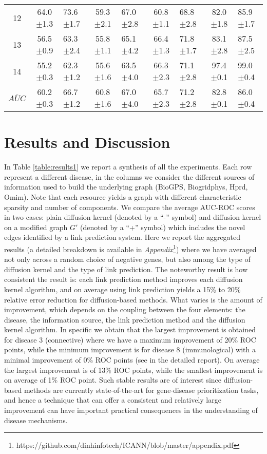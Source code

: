 {\begin{table*}[!htbp]
\begin{tabular}{|c|c|g|c|g|c|g|c|g|}
12 & 64.0$\pm$1.3 & 73.6$\pm$1.7 & 59.3$\pm$2.1 & 67.0$\pm$2.8 & 60.8$\pm$1.1 & 68.8$\pm$2.8 & 82.0$\pm$1.8 & 85.9$\pm$1.7 \\
13 & 56.5$\pm$0.9 & 63.3$\pm$2.4 & 55.8$\pm$1.1 & 65.1$\pm$4.2 & 66.4$\pm$1.3 & 71.8$\pm$1.7 & 83.1$\pm$2.8 & 87.5$\pm$2.5 \\
14 & 55.2$\pm$0.3 & 62.3$\pm$1.2 & 55.6$\pm$1.6 & 63.5$\pm$4.0 & 66.3$\pm$2.3 & 71.1$\pm$2.8 & 97.4$\pm$0.1 & 99.0$\pm$0.4 \\
\hline
$\overline{AUC}$ & 60.2$\pm$0.3 & 66.7$\pm$1.2 & 60.8$\pm$1.6 & 67.0$\pm$4.0 & 65.7$\pm$2.3 & 71.2$\pm$2.8 & 82.8$\pm$0.1 & 86.0$\pm$0.4 \\
\hline
\end{tabular}
\end{table*}

\section{Results and Discussion}
\label{results-discussion}
In Table \ref{table:results1} we report a synthesis of all the experiments. Each row represent a different disease, in the columns we consider the different sources of information used to build the underlying graph (BioGPS, Biogridphys, Hprd, Omim). Note that each resource yields a graph with different characteristic sparsity and number of components. We compare the average AUC-ROC scores in two cases: plain diffusion kernel (denoted by a ``-'' symbol) and diffusion kernel on a modified graph $G'$ (denoted by a ``+'' symbol) which includes the novel edges identified by a link prediction system. Here we report the aggregated results (a detailed breakdown is available in \textit{Appendix}\footnote{https://github.com/dinhinfotech/ICANN/blob/master/appendix.pdf}) where we have averaged not only across a random choice of negative genes, but also among the type of diffusion kernel and the type of link prediction. The noteworthy result is how consistent the result is: each link prediction method improves each diffusion kernel algorithm, and on
average using link prediction yields a 15\% to 20\% relative error reduction for diffusion-based methods. What varies is the amount of improvement, which depends on the coupling between the four elements: the disease, the
information source, the link prediction method and the diffusion kernel algorithm. In specific we obtain that the largest improvement is obtained for disease 3 (connective) where we have a maximum improvement of 20\% ROC points, while the minimum improvement is for disease 8 (immunological) with a minimal improvement of 0\% ROC points (see in the detailed report). On average the largest improvement is of 13\% ROC points, while the smallest improvement is on average of 1\% ROC point. Such stable results are of interest since diffusion-based methods are currently state-of-the-art for gene-disease prioritization tasks, and hence a technique that can offer a consistent and relatively large improvement can have important practical consequences in the understanding of disease mechanisms.
}
